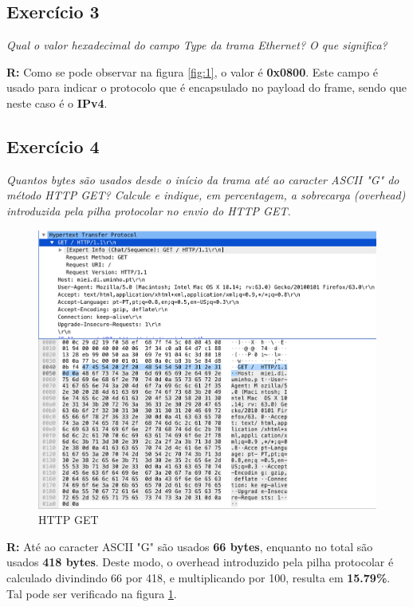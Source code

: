 \documentclass{llncs}
\begin{document}
\subsection{Exercício 3}
\emph{Qual o valor hexadecimal do campo Type da trama Ethernet? O que significa?}
\\ \par
\textbf{R:} Como se pode observar na figura \ref{fig:1}, o valor é \textbf{0x0800}.
Este campo é usado para indicar o protocolo que é encapsulado no payload do frame, sendo
que neste caso é o \textbf{IPv4}.


\subsection{Exercício 4}
\emph{Quantos bytes são usados desde o início da trama até ao caracter ASCII "G" do
método HTTP GET? Calcule e indique, em percentagem, a sobrecarga (overhead) introduzida
pela pilha protocolar no envio do HTTP GET.}

\begin{figure}[H]
\begin{center}
\includegraphics[scale=0.45]{4.png} 
\end{center}
\caption{\label{fig:4}HTTP GET}
\end{figure} 
\par
\textbf{R:} Até ao caracter ASCII "G" são usados \textbf{66 bytes}, enquanto no total são
usados \textbf{418 bytes}. Deste modo, o overhead introduzido pela pilha protocolar é
calculado divindindo 66 por 418, e multiplicando por 100, resulta em \textbf{15.79\%}. Tal
pode ser verificado na figura \ref{fig:4}.
\end{document}
